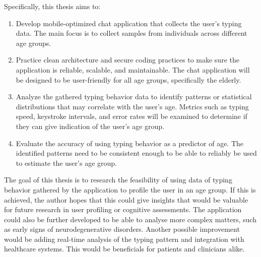 Specifically, this thesis aims to:
\begin{enumerate}
    \item Develop mobile-optimized chat application that collects the user's typing data.
    The main focus is to collect samples from individuals across different age groups.
    \item Practice clean architecture and secure coding practices to make sure the application is reliable, scalable, and maintainable. 
    The chat application will be designed to be user-friendly for all age groups, specifically the elderly.
    \item Analyze the gathered typing behavior data to identify patterns or statistical distributions that may correlate with the user's age. 
    Metrics such as typing speed, keystroke intervals, and error rates will be examined to determine if they can give indication of the user's age group.
    \item Evaluate the accuracy of using typing behavior as a predictor of age.
    The identified patterns need to be consistent enough to be able to reliably be used to estimate the user's age group.
\end{enumerate}

The goal of this thesis is to research the feasibility of using data of typing behavior gathered by the application to profile the user in an age group.
If this is achieved, the author hopes that this could give insights that would be valuable for future research in user profiling or cognitive assessments.
The application could also be further developed to be able to analyse more complex matters, such as early signs of neurodegenerative disorders.
Another possible improvement would be adding real-time analysis of the typing pattern and integration with healthcare systems.
This would be beneficials for patients and clinicians alike.